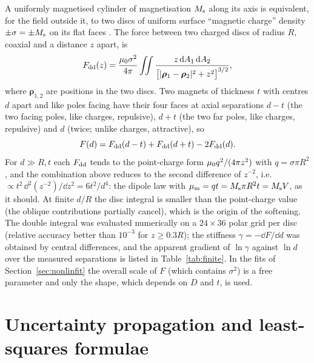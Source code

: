 A uniformly magnetised cylinder of magnetisation $M_{\rm s}$ along its axis is equivalent, for the field outside it, to two discs of uniform surface ``magnetic charge'' density $\pm\sigma=\pm M_{\rm s}$ on its flat faces \cite{griffiths,camacho}. The force between two charged discs of radius $R$, coaxial and a distance $z$ apart, is
\begin{equation}
F_{\rm dd}(z)=\frac{\mu_0\sigma^2}{4\pi}\iint\frac{z\,\mathrm{d} A_1\,\mathrm{d} A_2}{\big[|\bm\rho_1-\bm\rho_2|^2+z^2\big]^{3/2}},
\end{equation}
where $\bm\rho_{1,2}$ are positions in the two discs. Two magnets of thickness $t$ with centres $d$ apart and like poles facing have their four faces at axial separations $d-t$ (the two facing poles, like charges, repulsive), $d+t$ (the two far poles, like charges, repulsive) and $d$ (twice; unlike charges, attractive), so
\begin{equation}
F(d)=F_{\rm dd}(d-t)+F_{\rm dd}(d+t)-2F_{\rm dd}(d).
\end{equation}
For $d\gg R,t$ each $F_{\rm dd}$ tends to the point-charge form $\mu_0 q^2/(4\pi z^2)$ with $q=\sigma\pi R^2$, and the combination above reduces to the second difference of $z^{-2}$, i.e.\ $\propto t^2\,\dd^2(z^{-2})/\dd z^2=6t^2/d^4$: the dipole law with $\mu_{\mathrm m}=qt=M_{\rm s}\pi R^2t=M_{\rm s}V$, as it should. At finite $d/R$ the disc integral is smaller than the point-charge value (the oblique contributions partially cancel), which is the origin of the softening. The double integral was evaluated numerically on a $24\times36$ polar grid per disc (relative accuracy better than $10^{-3}$ for $z\geq0.3R$); the stiffness $\gamma=-\dd F/\dd d$ was obtained by central differences, and the apparent gradient of $\ln\gamma$ against $\ln d$ over the measured separations is listed in Table~\ref{tab:finite}. In the fits of Section~\ref{sec:nonlinfit} the overall scale of $F$ (which contains $\sigma^2$) is a free parameter and only the shape, which depends on $D$ and $t$, is used.

\section{Uncertainty propagation and least-squares formulae}\label{app:uncertainty}

